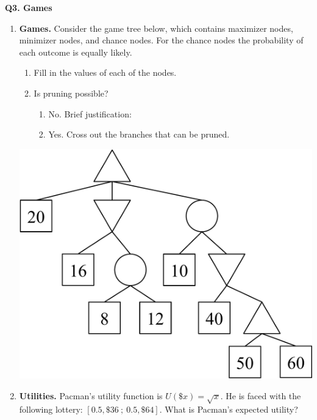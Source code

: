 \textbf{Q3. Games} \\

\begin{enumerate}
\item {\bf Games.} 
Consider the game tree below, which contains maximizer nodes, minimizer nodes, and chance nodes.  For the chance nodes the probability of each outcome is equally likely.

\begin{enumerate}
	\item  Fill in the values of each of the nodes.\\[3mm]

	\item Is pruning possible?\\[1mm]
	\begin{enumerate}
		\item No.  Brief justification: \\
		\item Yes.  Cross out the branches that can be pruned.
	\end{enumerate}
     

\end{enumerate}

\begin{center}
\includegraphics[width=0.71\linewidth]{figures/short-questions-games.pdf}
\end{center}



\item {\bf Utilities.} Pacman's utility function is $U(\$ x) = \sqrt{x}$.  He is faced with the following lottery: $[0.5, \$ 36 \ ; \ 0.5, \$ 64]$. What is Pacman's expected utility?



\end{enumerate}